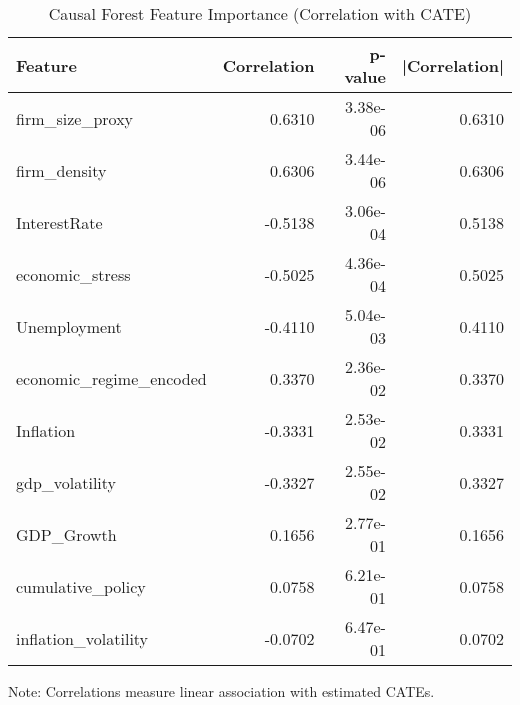 \begin{table}[htbp]
  \centering
  \caption{Causal Forest Feature Importance (Correlation with CATE)}
  \label{tab:cf_feature_importance}
  \small
  \begin{tabular}{lrrr}
    \toprule
    Feature & Correlation & p-value & |Correlation| \\
    \midrule
    firm\_size\_proxy & 0.6310 & 3.38e-06 & 0.6310 \\
    firm\_density & 0.6306 & 3.44e-06 & 0.6306 \\
    InterestRate & -0.5138 & 3.06e-04 & 0.5138 \\
    economic\_stress & -0.5025 & 4.36e-04 & 0.5025 \\
    Unemployment & -0.4110 & 5.04e-03 & 0.4110 \\
    economic\_regime\_encoded & 0.3370 & 2.36e-02 & 0.3370 \\
    Inflation & -0.3331 & 2.53e-02 & 0.3331 \\
    gdp\_volatility & -0.3327 & 2.55e-02 & 0.3327 \\
    GDP\_Growth & 0.1656 & 2.77e-01 & 0.1656 \\
    cumulative\_policy & 0.0758 & 6.21e-01 & 0.0758 \\
    inflation\_volatility & -0.0702 & 6.47e-01 & 0.0702 \\
    \bottomrule
  \end{tabular}
  \vspace{0.5em}
  {\footnotesize Note: Correlations measure linear association with estimated CATEs.}
\end{table}
